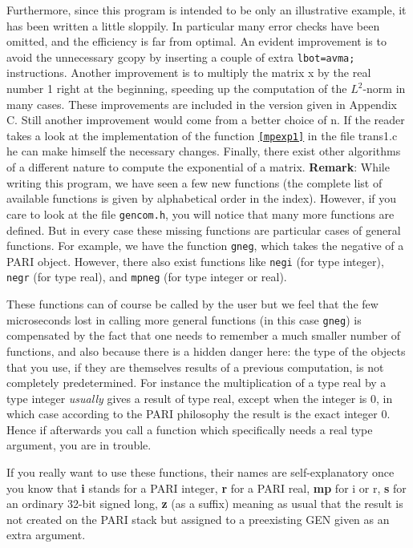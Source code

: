 Furthermore, since this program is intended to be only an illustrative 
example, it has been written a little sloppily. In particular many error checks
have been omitted, and the efficiency is far from optimal. An
evident improvement is to avoid the unnecessary gcopy by inserting a couple
of extra {\tt lbot=avma;} instructions. Another improvement is to multiply
the matrix x by the real number 1 right at the beginning, speeding up the
computation of the $L^2$-norm in many cases. These improvements are included
in the version given in Appendix C. Still
another improvement would come from a better choice of n. If the reader takes
a look at the implementation of the function {\tt \ref{mpexp1}} in the file trans1.c
he can make himself the necessary changes. Finally, there exist
other algorithms of a different nature to compute the exponential of a matrix.
\medskip
{\bf Remark}: While writing this program, we have seen a few new functions 
(the complete list of available functions is given by alphabetical order in the index). However, if you care to look at the file {\tt gencom.h}, you will notice that
many more functions are defined. But in every case these missing functions
are particular cases of general functions. For example, we have the function
{\tt gneg}, which takes the negative of a PARI object. However, there also 
exist functions like {\tt negi} (for type integer), {\tt negr} 
(for type real), and {\tt mpneg} (for type integer or real).

These functions can of course be called by the
user but we feel that the few microseconds lost in calling more general
functions (in this case {\tt gneg}) is compensated by the fact that one needs to
remember a much smaller number of functions, and also because there is a hidden
danger here: the type of the objects that you use, if they are themselves results
of a previous computation, is not completely predetermined. For instance the
multiplication of a type real by a type integer {\it usually\/} gives a result of
type real, except when the integer is 0, in which case according to the PARI
philosophy the result is the exact integer 0. Hence if afterwards you call a
function which specifically needs a real type argument, you are in trouble.

If you really want to use these functions, their names are self-explanatory once
you know that {\bf i} stands for a PARI integer, {\bf r} for a PARI real,
{\bf mp} for i or r, {\bf s} for an ordinary 32-bit signed long, {\bf z} (as a
suffix) meaning as usual that the result is not created on the PARI stack but
assigned to a preexisting GEN given as an extra argument.

